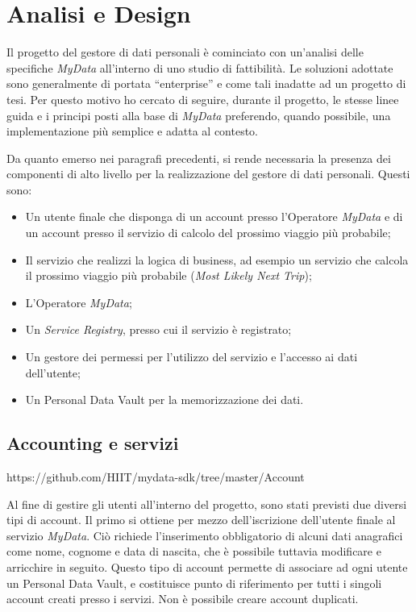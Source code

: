 \chapter{Analisi e Design}
\label{capitolo4}
\thispagestyle{empty}

\noindent Il progetto del gestore di dati personali \`e cominciato con un’analisi delle specifiche \textit{MyData} all’interno di uno studio di fattibilit\`a. Le soluzioni adottate sono generalmente di portata “enterprise” e come tali inadatte ad un progetto di tesi. Per questo motivo ho cercato di seguire, durante il progetto, le stesse linee guida e i principi posti alla base di \textit{MyData} preferendo, quando possibile, una implementazione pi\`u semplice e adatta al contesto.

Da quanto emerso nei paragrafi precedenti, si rende necessaria la presenza dei componenti di alto livello per la realizzazione del gestore di dati personali. Questi sono:
\begin{itemize}
	\item Un utente finale che disponga di un account presso l’Operatore \textit{MyData} e di un account presso il servizio di calcolo del prossimo viaggio pi\`u probabile;
	\item Il servizio che realizzi la logica di business, ad esempio un servizio che calcola il prossimo viaggio pi\`u probabile (\textit{Most Likely Next Trip});
	\item L’Operatore \textit{MyData};
	\item Un \textit{Service Registry}, presso cui il servizio \`e registrato;
	\item Un gestore dei permessi per l’utilizzo del servizio e l’accesso ai dati dell’utente;
	\item Un Personal Data Vault per la memorizzazione dei dati.
\end{itemize}

\section{Accounting e servizi}
https://github.com/HIIT/mydata-sdk/tree/master/Account

Al fine di gestire gli utenti all’interno del progetto, sono stati previsti due diversi tipi di account. Il primo si ottiene per mezzo dell’iscrizione dell’utente finale al servizio \textit{MyData}. Ci\`o richiede l’inserimento obbligatorio di alcuni dati anagrafici come nome, cognome e data di nascita, che \`e possibile tuttavia modificare e arricchire in seguito. Questo tipo di account permette di associare ad ogni utente un Personal Data Vault, e costituisce punto di riferimento per tutti i singoli account creati presso i servizi. Non \`e possibile creare account duplicati.

